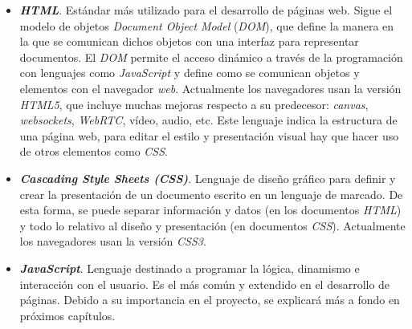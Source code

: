 \begin{itemize} 
    \item \textit{\textbf{HTML}}. Estándar más utilizado para el desarrollo de páginas web. Sigue el modelo de objetos \textit{Document Object Model} (\textit{DOM}), que define la manera en la que se comunican dichos objetos con una interfaz para representar documentos. El \textit{DOM} permite el acceso dinámico a través de la programación con lenguajes como \textit{JavaScript} y define como se comunican objetos y elementos con el navegador \textit{web}.
    Actualmente los navegadores usan la versión \textit{HTML5}, que incluye muchas mejoras respecto a su predecesor: \textit{canvas}, \textit{websockets}, \textit{WebRTC}, vídeo, audio, etc. Este lenguaje indica la estructura de una página web, para editar el estilo y presentación visual hay que hacer uso de otros elementos como \textit{CSS}.
    \item \textit{\textbf{Cascading Style Sheets (CSS)}}. Lenguaje de diseño gráfico para definir y crear la presentación de un documento escrito en un lenguaje de marcado. De esta forma, se puede separar información y datos (en los documentos \textit{HTML}) y todo lo relativo al diseño y presentación (en documentos \textit{CSS}). Actualmente los navegadores usan la versión \textit{CSS3}.
    \item \textit{\textbf{JavaScript}}. Lenguaje destinado a programar la lógica, dinamismo e interacción con el usuario. Es el más común y extendido en el desarrollo de páginas. Debido a su importancia en el proyecto, se explicará más a fondo en próximos capítulos. 
\end{itemize}

